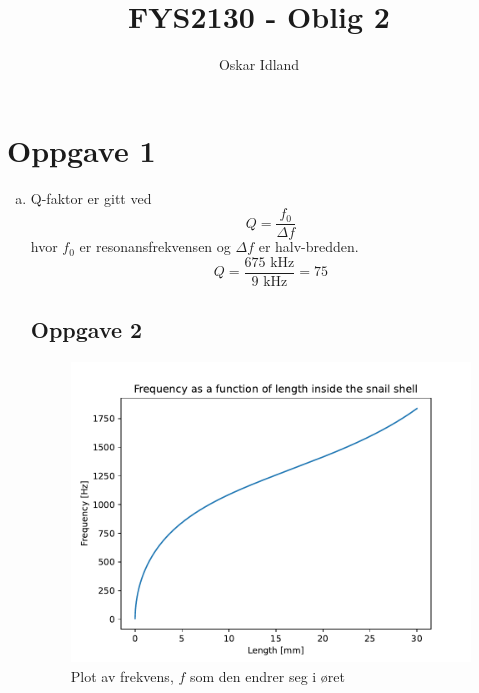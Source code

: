 \documentclass{article}
\author{Oskar Idland}
\title{FYS2130 - Oblig 2}
\date{}
\begin{document}
\maketitle
\newpage

\section*{Oppgave 1}
\begin{enumerate}[a)]
\item 
Q-faktor er gitt ved
\[
Q = \frac{f_0}{Δf}
\]  
hvor $f_0$ er resonansfrekvensen og $Δf$ er halv-bredden. 
\[
Q = \frac{675 \text{ kHz}}{9 \text{ kHz}} = 75
\]

\subsection*{Oppgave 2}
\begin{figure}[h!]
  \centering
  \includegraphics[scale = .45]{figs/1.b.pdf}
  \caption{Plot av frekvens, $f$ som den endrer seg i øret}
  \label{fig: 1.b}
\end{figure}


\end{enumerate}
\end{document}
